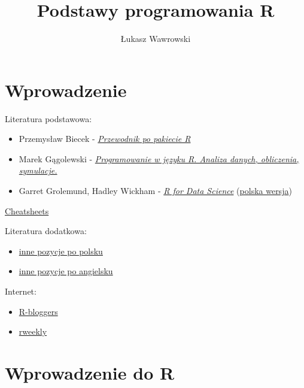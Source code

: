 \documentclass[]{book}
\title{Podstawy programowania R}
\author{Łukasz Wawrowski}
\date{}
\providecommand{\tightlist}{%
  \setlength{\itemsep}{0pt}\setlength{\parskip}{0pt}}
\begin{document}
\maketitle

{
\setcounter{tocdepth}{1}
\tableofcontents
}
\chapter*{Wprowadzenie}\label{wprowadzenie}

Literatura podstawowa:

\begin{itemize}
\tightlist
\item
  Przemysław Biecek -
  \href{http://pbiecek.github.io/Przewodnik/}{\emph{Przewodnik po
  pakiecie R}}
\item
  Marek Gągolewski -
  \href{http://www.gagolewski.com/publications/programowanier/}{\emph{Programowanie
  w języku R. Analiza danych, obliczenia, symulacje.}}
\item
  Garret Grolemund, Hadley Wickham -
  \href{http://r4ds.had.co.nz/}{\emph{R for Data Science}}
  (\href{https://helion.pl/ksiazki/jezyk-r-kompletny-zestaw-narzedzi-dla-analitykow-danych-hadley-wickham-garrett-grolemund,jezrko.htm}{polska
  wersja})
\end{itemize}

\href{https://www.rstudio.com/resources/cheatsheets/}{Cheatsheets}

Literatura dodatkowa:

\begin{itemize}
\tightlist
\item
  \href{https://github.com/mi2-warsaw/SER/blob/master/histoRia/README.md}{inne
  pozycje po polsku}
\item
  \href{https://bookdown.org/}{inne pozycje po angielsku}
\end{itemize}

Internet:

\begin{itemize}
\tightlist
\item
  \href{https://www.r-bloggers.com/}{R-bloggers}
\item
  \href{https://rweekly.org/}{rweekly}
\end{itemize}

\chapter{Wprowadzenie do R}\label{wprowadzenie-do-r}
\end{document}
